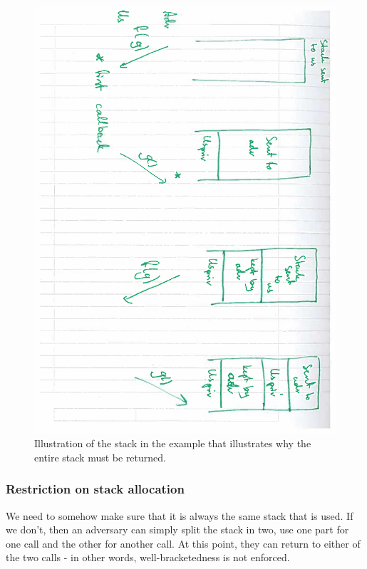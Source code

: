 \documentclass[a4paper]{article}
\begin{document}
\begin{figure}
  \centering
  \includegraphics[angle=90,width=\textwidth]{img/ret-full-stk.pdf}
  \caption{Illustration of the stack in the example that illustrates why the entire stack must be returned.}
  \label{fig:ret-full-stk}
\end{figure}

\subsubsection{Restriction on stack allocation}
We need to somehow make sure that it is always the same stack that is used. If we don't, then an adversary can simply split the stack in two, use one part for one call and the other for another call. At this point, they can return to either of the two calls - in other words, well-bracketedness is not enforced.
\end{document}
